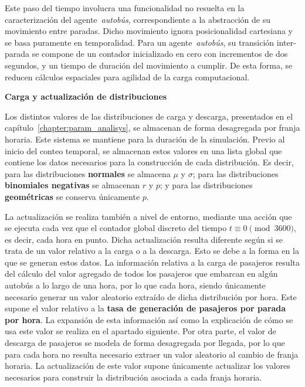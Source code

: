 Este paso del tiempo involucra una funcionalidad no resuelta en la caracterización del agente~\textit{autobús}, correspondiente
a la abstracción de su movimiento entre paradas. Dicho movimiento ignora posicionalidad cartesiana y se basa puramente en 
temporalidad. Para un agente~\textit{autobús}, su transición inter-parada se compone de un contador inicializado en cero con 
incrementos de dos segundos, y un tiempo de duración del movimiento a cumplir. De esta forma, se reducen cálculos espaciales para
agilidad de la carga computacional.


\medskip
\noindent\textbf{Carga y actualización de distribuciones}

Los distintos valores de las distribuciones de carga y descarga, presentados en el capítulo~\ref{chapter:param_analisys}, se
almacenan de forma desagregada por franja horaria. Este sistema se mantiene para la duración de la simulación. Previo al inicio
del conteo temporal, se almacenan estos valores en una lista global que contiene los datos necesarios para la construcción de cada
distribución. Es decir, para las distribuciones \textbf{normales} se almacena $\mu$ y $\sigma$; para las distribuciones
\textbf{binomiales negativas} se almacenan $r$ y $p$; y para las distribuciones \textbf{geométricas} se conserva únicamente $p$.

La actualización se realiza también a nivel de entorno, mediante una acción que se ejecuta cada vez que el contador global
discreto del tiempo $t \equiv 0 \pmod{3600}$, es decir, cada hora en punto. Dicha actualización resulta
diferente según si se trata de un valor relativo a la carga o a la descarga. Esto se debe a la forma en la que se generan estos datos.
La información relativa a la carga de pasajeros resulta del cálculo del valor agregado de todos los pasajeros que embarcan 
en algún autobús a lo largo de una hora, por lo que cada hora, siendo únicamente necesario generar un valor aleatorio
extraído de dicha distribución por hora. Este supone el valor relativo a la \textbf{tasa de generación de pasajeros por 
parada por hora}. La expansión de esta información así como la explicación de cómo se usa este valor se realiza en el apartado siguiente.
Por otra parte, el valor de descarga de pasajeros se modela de forma desagregada por llegada, por lo que para cada hora no resulta
necesario extraer un valor aleatorio al cambio de franja horaria. La actualización de este valor supone únicamente actualizar los
valores necesarios para construir la distribución asociada a cada franja horaria.

